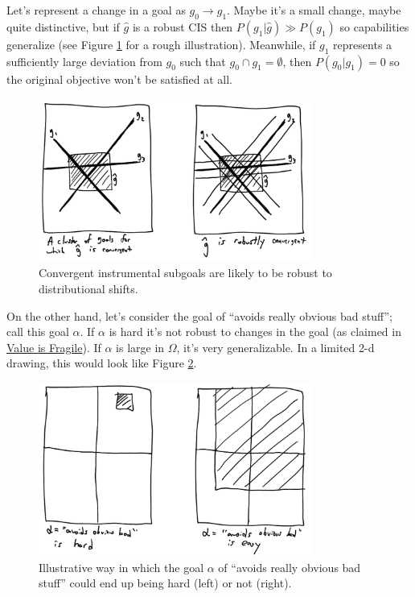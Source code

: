\documentclass{article}
\begin{document}
Let's represent a change in a goal as $g_0 \rightarrow g_1$. Maybe it's a small change, maybe quite distinctive, but if $\hat{g}$ is a robust CIS then $P(g_1|\hat{g})\gg P(g_1)$ so capabilities generalize (see Figure \ref{fig:robust-CIS} for a rough illustration). Meanwhile, if $g_1$ represents a sufficiently large deviation from $g_0$ such that $g_0 \cap g_1 = \emptyset$, then $P(g_0|g_1)=0$ so the original objective won't be satisfied at all.

\begin{figure}[ht]
    \centering
    \includegraphics[width=0.8\textwidth]{pics/robust-CIS.png} 
    \caption{Convergent instrumental subgoals are likely to be robust to distributional shifts.}
    \label{fig:robust-CIS} 
\end{figure}

On the other hand, let's consider the goal of ``avoids really obvious bad stuff''; call this goal $\alpha$. If $\alpha$ is hard it's not robust to changes in the goal (as claimed in \href{https://www.lesswrong.com/posts/GNnHHmm8EzePmKzPk/value-is-fragile}{Value is Fragile}). If $\alpha$ is large in $\Omega$, it's very generalizable. In a limited 2-d drawing, this would look like Figure \ref{fig:alpha}.

\begin{figure}[ht]
    \centering
    \includegraphics[width=0.8\textwidth]{pics/alpha.png} 
    \caption{Illustrative way in which the goal $\alpha$ of ``avoids really obvious bad stuff'' could end up being hard (left) or not (right).}
    \label{fig:alpha} 
\end{figure}
\end{document}

